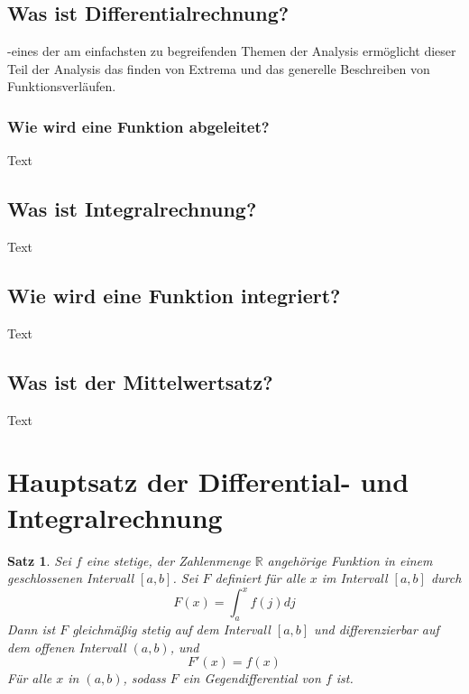 \documentclass[fontsize=12pt,paper=a4,DIV12,cleardoublepage=empty, 
liststotoc,idxtotoc,bibtotoc]{article}
\newcommand{\RR}{\mathbb{R}}
\theoremstyle{plain}
\newtheorem{satz}{Satz}[subsection]
\theoremstyle{definition}
\begin{document}
	
	\subsection{Was ist Differentialrechnung?}
	-eines der am einfachsten zu begreifenden Themen der Analysis ermöglicht dieser Teil der Analysis das finden von Extrema und das generelle Beschreiben von Funktionsverläufen.
	
	
	\subsubsection{Wie wird eine Funktion abgeleitet?}
		Text
	
	
	\subsection{Was ist Integralrechnung?}
		Text


	\subsection{Wie wird eine Funktion integriert?}
		Text
		
	
	\subsection{Was ist der Mittelwertsatz?}
		Text
	
	
	
	\section{Hauptsatz der Differential- und Integralrechnung}

	\begin{satz}
		Sei $f$ eine stetige, der Zahlenmenge $\RR$ angehörige Funktion in einem geschlossenen Intervall $[a, b]$. Sei $F$ definiert für alle $x$ im Intervall $[a, b]$ durch \\
			\begin{equation}
				F(x)=\int_{a}^{x}f(j) dj
			\end{equation}
		Dann ist $F$ gleichmäßig stetig auf dem Intervall $[a, b]$ und differenzierbar auf dem offenen Intervall $(a, b)$, und 
			\begin{equation}
				F'(x)=f(x)
			\end{equation}
		Für alle $x$ in $(a, b)$, sodass $F$ ein Gegendifferential von $f$ ist.\\\\
	\end{satz}
	
\end{document}
